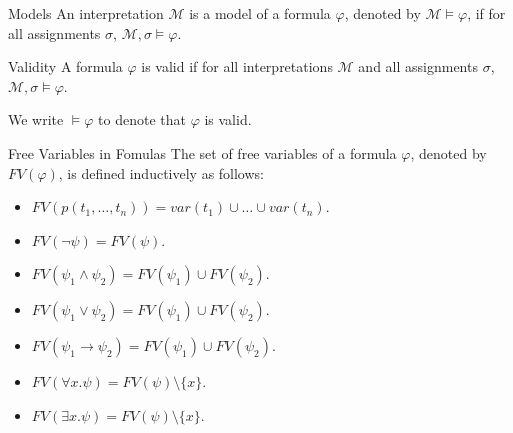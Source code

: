 \documentclass{beamer}
\begin{document}
  \begin{frame}{Models}
    An interpretation $\mathcal{M}$ is a model of a formula $\varphi$, denoted by $\mathcal{M}\models\varphi$, if for all assignments $\sigma$, $\mathcal{M}, \sigma\models\varphi$.
    
    
    
  \end{frame}
 

  \begin{frame}{Validity}
    A formula $\varphi$ is valid if for all interpretations $\mathcal{M}$ and all assignments $\sigma$, $\mathcal{M}, \sigma\models\varphi$.
    
    We write $\models\varphi$ to denote that $\varphi$ is valid.
  \end{frame}

  \begin{frame}{Free Variables in Fomulas}
    The set of free variables of a formula $\varphi$, denoted by $FV(\varphi)$, is defined inductively as follows:
    \begin{itemize}
    \item $FV(p(t_1, \ldots, t_n))=var(t_1)\cup\ldots\cup var(t_n)$.
    \item $FV(\neg\psi)=FV(\psi)$.
    \item $FV(\psi_1\wedge\psi_2)=FV(\psi_1)\cup FV(\psi_2)$.
    \item $FV(\psi_1\vee\psi_2)=FV(\psi_1)\cup FV(\psi_2)$.
    \item $FV(\psi_1\rightarrow\psi_2)=FV(\psi_1)\cup FV(\psi_2)$.
    \item $FV(\forall x.\psi)=FV(\psi)\setminus\{x\}$.
    \item $FV(\exists x.\psi)=FV(\psi)\setminus\{x\}$.
    \end{itemize}
  \end{frame}
\end{document}
